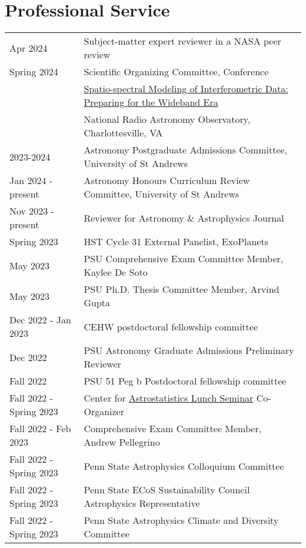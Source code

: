 \section*{Professional Service}
\begin{tabular*}{\textwidth}{@{\hspace{10pt}}p{1.4in}l}
Apr 2024 & Subject-matter expert reviewer in a NASA peer review \\
Spring 2024 & Scientific Organizing Committee, Conference\\
& \href{https://science.nrao.edu/facilities/alma/naasc-workshops/ssmid/index}{Spatio-spectral Modeling of Interferometric Data: Preparing for the Wideband Era} \\
& National Radio Astronomy Observatory, Charlottesville, VA \\
2023-2024 & Astronomy Postgraduate Admissions Committee, University of St Andrews \\
Jan 2024 - present & Astronomy Honours Curriculum Review Committee, University of St Andrews \\
Nov 2023 - present & Reviewer for Astronomy \& Astrophysics Journal \\
Spring 2023 & HST Cycle 31 External Panelist, ExoPlanets \\
May 2023 & PSU Comprehensive Exam Committee Member, Kaylee De Soto \\    
May 2023 & PSU Ph.D. Thesis Committee Member, Arvind Gupta\\
Dec 2022 - Jan 2023 & CEHW postdoctoral fellowship committee \\
Dec 2022 & PSU Astronomy Graduate Admissions Preliminary Reviewer \\
Fall 2022 & PSU 51 Peg b Postdoctoral fellowship committee \\
Fall 2022 - Spring 2023 & Center for \href{https://sites.psu.edu/astrostatistics/cast-lunch-meetings/}{Astrostatistics Lunch Seminar} Co-Organizer \\
Fall 2022 - Feb 2023 & Comprehensive Exam Committee Member, Andrew Pellegrino \\    
Fall 2022 - Spring 2023 & Penn State Astrophysics Colloquium Committee \\
Fall 2022 - Spring 2023 & Penn State ECoS Sustainability Council Astrophysics Representative \\
Fall 2022 - Spring 2023 & Penn State Astrophysics Climate and Diversity Committee \\

\end{tabular*}
